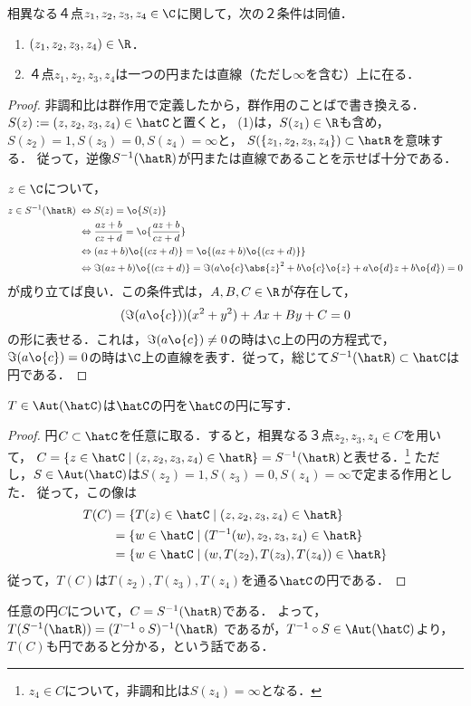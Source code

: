 \documentclass[uplatex, dvipdfmx]{jsreport}
\begin{document}
\begin{theorem}[非調和比による円の特徴付け]
    相異なる４点$z_1,z_2,z_3,z_4\in\C$に関して，次の２条件は同値．
    \begin{enumerate}
        \item $(z_1,z_2,z_3,z_4)\in\R$．
        \item ４点$z_1,z_2,z_3,z_4$は一つの円または直線（ただし$\infty$を含む）上に在る．
    \end{enumerate}
\end{theorem}
\begin{proof}
    非調和比は群作用で定義したから，群作用のことばで書き換える．
    $S(z):=(z,z_2,z_3,z_4)\in\hatC$と置くと，
    (1)は，$S(z_1)\in\R$も含め，$S(z_2)=1,S(z_3)=0,S(z_4)=\infty$と，
    $S(\{z_1,z_2,z_3,z_4\})\subset\hatR$を意味する．
    従って，逆像$S^{-1}(\hatR)$が円または直線であることを示せば十分である．

    $z\in\C$について，
    \begin{align*}
        z\in S^{-1}(\hatR)\;\Leftrightarrow\;&S(z)=\o{S(z)}\\
        \;\Leftrightarrow\;&\frac{az+b}{cz+d}=\o{\frac{az+b}{cz+d}}\\
        \;\Leftrightarrow\;&(az+b)\o{(cz+d)}=\o{(az+b)\o{(cz+d)}}\\
        \;\Leftrightarrow\;&\Im(az+b)\o{(cz+d)}=\Im(a\o{c}\abs{z}^2+b\o{c}\o{z}+a\o{d}z+b\o{d})=0
    \end{align*}
    が成り立てば良い．この条件式は，$A,B,C\in\R$が存在して，
    \[(\Im(a\o{c}))(x^2+y^2)+Ax+By+C=0\]
    の形に表せる．これは，$\Im(a\o{c})\ne 0$の時は$\C$上の円の方程式で，
    $\Im(a\o{c})=0$の時は$\C$上の直線を表す．従って，総じて$S^{-1}(\hatR)\subset\hatC$は円である．
\end{proof}

\begin{corollary}[Möbius変換は円に円を対応させる]
    $T\in\Aut(\hatC)$は$\hatC$の円を$\hatC$の円に写す．
\end{corollary}
\begin{proof}
    円$C\subset\hatC$を任意に取る．すると，相異なる３点$z_2,z_3,z_4\in C$を用いて，
    $C=\{z\in\hatC\mid(z,z_2,z_3,z_4)\in\hatR\}=S^{-1}(\hatR)$と表せる．\footnote{$z_4\in C$について，非調和比は$S(z_4)=\infty$となる．}
    ただし，$S\in\Aut(\hatC)$は$S(z_2)=1,S(z_3)=0,S(z_4)=\infty$で定まる作用とした．
    従って，この像は
    \begin{align*}
        T(C)&=\{T(z)\in\hatC\mid(z,z_2,z_3,z_4)\in\hatR\}\\
        &=\{w\in\hatC\mid(T^{-1}(w),z_2,z_3,z_4)\in\hatR\}\\
        &=\{w\in\hatC\mid(w,T(z_2),T(z_3),T(z_4))\in\hatR\}
    \end{align*}
    従って，$T(C)$は$T(z_2),T(z_3),T(z_4)$を通る$\hatC$の円である．
\end{proof}
\begin{remarks}
    任意の円$C$について，$C=S^{-1}(\hatR)$である．
    よって，$T(S^{-1}(\hatR))=(T^{-1}\circ S)^{-1}(\hatR)$
    であるが，$T^{-1}\circ S\in\Aut(\hatC)$より，$T(C)$も円であると分かる，という話である．
\end{remarks}
\end{document}
